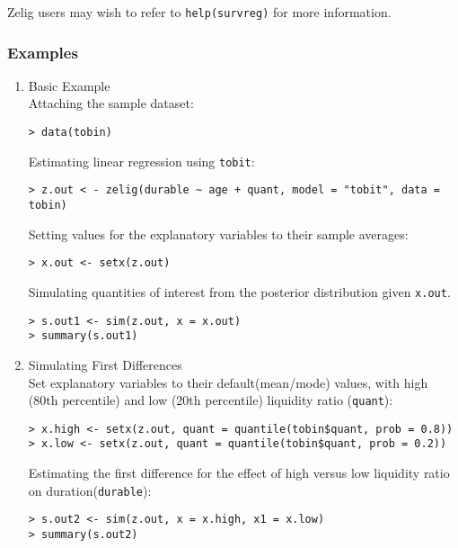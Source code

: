 Zelig users may wish to refer to \texttt{help(survreg)} for more 
information.

\subsubsection{Examples}

\begin{enumerate}
\item {Basic Example} \\
Attaching the sample  dataset:
\begin{verbatim}
> data(tobin)
\end{verbatim}
Estimating linear regression using \texttt{tobit}:
\begin{verbatim}
> z.out < - zelig(durable ~ age + quant, model = "tobit", data = tobin)
\end{verbatim}
Setting values for the explanatory variables to their sample averages:
\begin{verbatim}
> x.out <- setx(z.out)
\end{verbatim}
Simulating quantities of interest from the posterior distribution given 
\texttt{x.out}.
\begin{verbatim}
> s.out1 <- sim(z.out, x = x.out)
> summary(s.out1)
\end{verbatim}
\item {Simulating First Differences} \\
Set explanatory variables to their default(mean/mode) values, with high
(80th percentile) and low (20th percentile) liquidity ratio (\texttt{quant}):

\begin{verbatim}
> x.high <- setx(z.out, quant = quantile(tobin$quant, prob = 0.8))
> x.low <- setx(z.out, quant = quantile(tobin$quant, prob = 0.2))
\end{verbatim}
Estimating the first difference for the effect of
high versus low liquidity ratio on duration(\texttt{durable}):
\begin{verbatim}
> s.out2 <- sim(z.out, x = x.high, x1 = x.low)
> summary(s.out2)
\end{verbatim}
\end{enumerate} 

